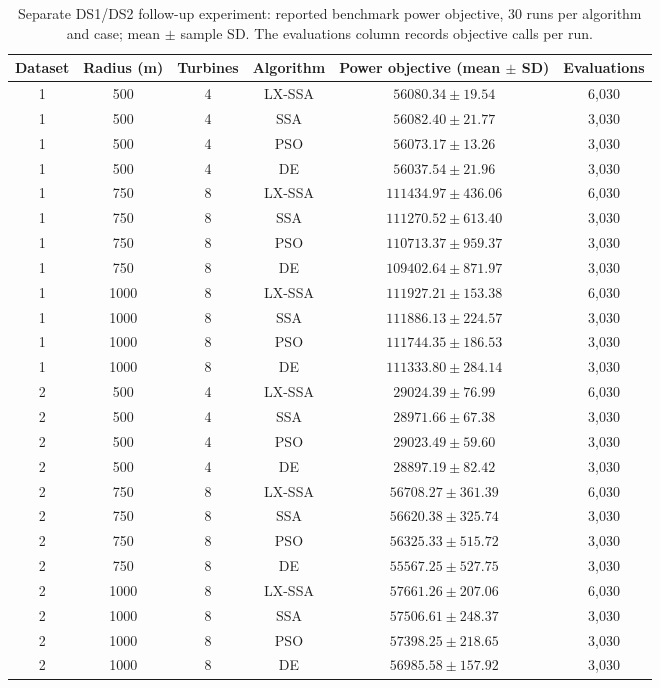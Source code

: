 \begin{table}[!t]
\centering\caption{Separate DS1/DS2 follow-up experiment: reported benchmark power objective, 30 runs per algorithm and case; mean $\pm$ sample SD. The evaluations column records objective calls per run.}
\label{tab:followup-results}
\footnotesize\setlength{\tabcolsep}{3pt}
\begin{tabular}{cccccc}
\toprule
Dataset & Radius (m) & Turbines & Algorithm & Power objective (mean $\pm$ SD) & Evaluations \\
\midrule
1 & 500 & 4 & LX-SSA & $56080.34 \pm 19.54$ & 6,030 \\
1 & 500 & 4 & SSA & $56082.40 \pm 21.77$ & 3,030 \\
1 & 500 & 4 & PSO & $56073.17 \pm 13.26$ & 3,030 \\
1 & 500 & 4 & DE & $56037.54 \pm 21.96$ & 3,030 \\
\midrule
1 & 750 & 8 & LX-SSA & $111434.97 \pm 436.06$ & 6,030 \\
1 & 750 & 8 & SSA & $111270.52 \pm 613.40$ & 3,030 \\
1 & 750 & 8 & PSO & $110713.37 \pm 959.37$ & 3,030 \\
1 & 750 & 8 & DE & $109402.64 \pm 871.97$ & 3,030 \\
\midrule
1 & 1000 & 8 & LX-SSA & $111927.21 \pm 153.38$ & 6,030 \\
1 & 1000 & 8 & SSA & $111886.13 \pm 224.57$ & 3,030 \\
1 & 1000 & 8 & PSO & $111744.35 \pm 186.53$ & 3,030 \\
1 & 1000 & 8 & DE & $111333.80 \pm 284.14$ & 3,030 \\
\midrule
2 & 500 & 4 & LX-SSA & $29024.39 \pm 76.99$ & 6,030 \\
2 & 500 & 4 & SSA & $28971.66 \pm 67.38$ & 3,030 \\
2 & 500 & 4 & PSO & $29023.49 \pm 59.60$ & 3,030 \\
2 & 500 & 4 & DE & $28897.19 \pm 82.42$ & 3,030 \\
\midrule
2 & 750 & 8 & LX-SSA & $56708.27 \pm 361.39$ & 6,030 \\
2 & 750 & 8 & SSA & $56620.38 \pm 325.74$ & 3,030 \\
2 & 750 & 8 & PSO & $56325.33 \pm 515.72$ & 3,030 \\
2 & 750 & 8 & DE & $55567.25 \pm 527.75$ & 3,030 \\
\midrule
2 & 1000 & 8 & LX-SSA & $57661.26 \pm 207.06$ & 6,030 \\
2 & 1000 & 8 & SSA & $57506.61 \pm 248.37$ & 3,030 \\
2 & 1000 & 8 & PSO & $57398.25 \pm 218.65$ & 3,030 \\
2 & 1000 & 8 & DE & $56985.58 \pm 157.92$ & 3,030 \\

\bottomrule
\end{tabular}
\end{table}

